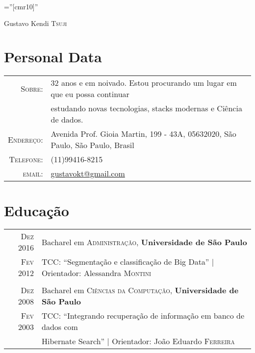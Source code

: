 \documentclass[a4paper,10pt]{article}
\begin{document}

\pagestyle{empty} %

\font\fb=''[cmr10]'' %

\par{\centering
    {\Huge Gustavo Kendi \textsc{Tsuji}
  }\bigskip\par}

\section{Personal Data}

\begin{tabular}{rl}
  \textsc{Sobre:}   & 32 anos e em noivado. Estou procurando um lugar em que eu possa continuar \\
    &estudando novas tecnologias, stacks modernas e Ciência de dados.\\
    \textsc{Endereço:}   & Avenida Prof. Gioia Martin, 199 - 43A, 05632020, São Paulo, São Paulo, Brasil \\
    \textsc{Telefone:}     & (11)99416-8215\\
    \textsc{email:}     & \href{mailto:gustavokt@gmail.com}{gustavokt@gmail.com}
\end{tabular}

\section{Educação}
\begin{tabular}{rl} 
 \textsc{Dez} 2016 & Bacharel em \textsc{Administração}, \textbf{Universidade de São Paulo}\\
\textsc{Fev} 2012&TCC: ``Segmentação e classificação de Big Data'' | \small Orientador: Alessandra \textsc{Montini}\\\\
\textsc{Dez} 2008& Bacharel em \textsc{Ciências da Computação}, \textbf{Universidade de São Paulo}\\
\textsc{Fev} 2003& TCC: ``Integrando recuperação de informação em banco de dados com \\
& Hibernate Search'' | \small Orientador: João Eduardo \textsc{Ferreira}\\
\end{tabular}
\end{document}
